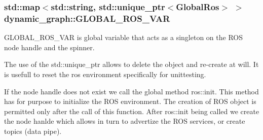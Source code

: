 \subsubsection[{\texorpdfstring{G\+L\+O\+B\+A\+L\+\_\+\+R\+O\+S\+\_\+\+V\+AR}{GLOBAL_ROS_VAR}}]{\setlength{\rightskip}{0pt plus 5cm}std\+::map$<$std\+::string, std\+::unique\+\_\+ptr$<${\bf Global\+Ros}$>$ $>$ dynamic\+\_\+graph\+::\+G\+L\+O\+B\+A\+L\+\_\+\+R\+O\+S\+\_\+\+V\+AR\hspace{0.3cm}{\ttfamily [static]}}\hypertarget{namespacedynamic__graph_a877a1ed0d2adf7f675abf17f70b936a6}{}\label{namespacedynamic__graph_a877a1ed0d2adf7f675abf17f70b936a6}


G\+L\+O\+B\+A\+L\+\_\+\+R\+O\+S\+\_\+\+V\+AR is global variable that acts as a singleton on the R\+OS node handle and the spinner. 

The use of the std\+::unique\+\_\+ptr allows to delete the object and re-\/create at will. It is usefull to reset the ros environment specifically for unittesting.

If the node handle does not exist we call the global method ros\+::init. This method has for purpose to initialize the R\+OS environment. The creation of R\+OS object is permitted only after the call of this function. After ros\+::init being called we create the node hanlde which allows in turn to advertize the R\+OS services, or create topics (data pipe). 